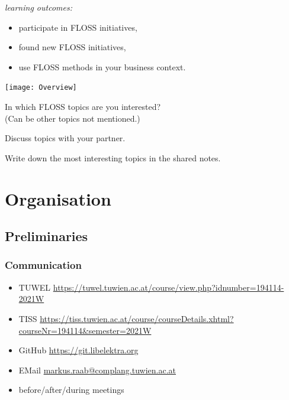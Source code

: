 \begin{frame}
	\textit{learning outcomes:}
	\begin{itemize}
		\item participate in FLOSS initiatives,
		\item found new FLOSS initiatives,
		\item use FLOSS methods in your business context.
	\end{itemize}
\end{frame}


\begin{frame}
	\texttt{[image: Overview]}
\end{frame}



\begin{assignment}
	In which FLOSS topics are you interested? \\
	(Can be other topics not mentioned.)

	\begin{task}[1]
	Discuss topics with your partner.
	\end{task}

	\begin{task}[2]
	Write down the most interesting topics in the shared notes.
	\end{task}
\end{assignment}





\section{Organisation}

\subsection{Preliminaries}
\begin{frame}
	\frametitle{Communication}
	\begin{itemize}
		\item TUWEL \url{https://tuwel.tuwien.ac.at/course/view.php?idnumber=194114-2021W}
		\item TISS \url{https://tiss.tuwien.ac.at/course/courseDetails.xhtml?courseNr=194114&semester=2021W}
		\item GitHub \url{https://git.libelektra.org}
		\item EMail \url{markus.raab@complang.tuwien.ac.at}
		\item before/after/during meetings
	\end{itemize}
\end{frame}

